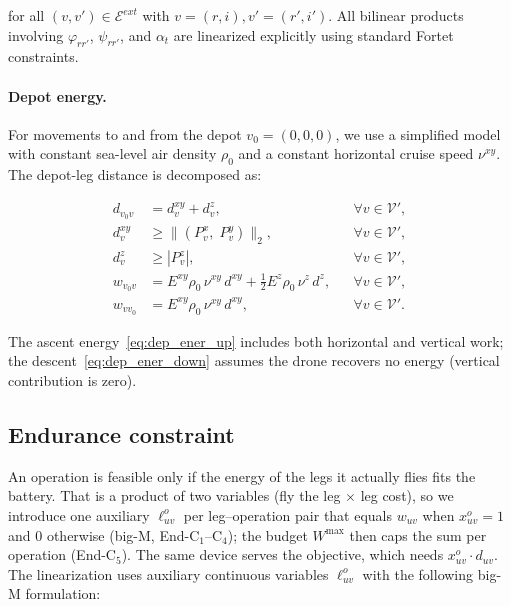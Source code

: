 \documentclass[12pt]{elsarticle}
\begin{document}
\noindent for all $(v,v')\in\mathcal E^{ext}$ with $v=(r,i), v'=(r',i')$. All bilinear products involving $\varphi_{rr'}$, $\psi_{rr'}$, and $\alpha_t$ are linearized explicitly using standard Fortet constraints.

\paragraph{Depot energy.}
For movements to and from the depot $v_0=(0,0,0)$, we use a simplified model with constant sea-level air density $\rho_0$ and a constant horizontal cruise speed $\nu^{xy}$. The depot-leg distance is decomposed as:

\begin{align}
    d_{v_0v} &= d_{v}^{xy} + d_v^z,
              && \forall v\in\mathcal V',
              \label{eq:dep_dist}\tag{Dep-C$_1$}\\
    d_{v}^{xy} &\ge \bigl\| (P_v^x,\;P_v^y) \bigr\|_2,
              && \forall v\in\mathcal V',
              \label{eq:dep_soc}\tag{Dep-C$_2$}\\
    d_v^z &\ge |P_v^z|,
              && \forall v\in\mathcal V',
              \label{eq:dep_z}\tag{Dep-C$_3$}\\
    w_{v_0v} &= E^{xy}\rho_0\,\nu^{xy}\,d^{xy} + \tfrac12 E^{z}\rho_0\,\nu^{z}\,d^z,
              && \forall v\in\mathcal V',
              \label{eq:dep_ener_up}\tag{Dep-C$_4$}\\
    w_{vv_0} &= E^{xy}\rho_0\,\nu^{xy}\,d^{xy},
              && \forall v\in\mathcal V'.
              \label{eq:dep_ener_down}\tag{Dep-C$_5$}
\end{align}

\noindent The ascent energy~\eqref{eq:dep_ener_up} includes both horizontal and vertical work; the descent~\eqref{eq:dep_ener_down} assumes the drone recovers no energy (vertical contribution is zero).

\subsection{Endurance constraint}

An operation is feasible only if the energy of the legs it actually flies fits the battery. That is a product of two variables (fly the leg $\times$ leg cost), so we introduce one auxiliary $\ell_{uv}^o$ per leg--operation pair that equals $w_{uv}$ when $x_{uv}^o=1$ and $0$ otherwise (big-M, End-C$_1$--C$_4$); the budget $W^{\max}$ then caps the sum per operation (End-C$_5$). The same device serves the objective, which needs $x_{uv}^o\cdot d_{uv}$. The linearization uses auxiliary continuous variables $\ell_{uv}^o$ with the following big-M formulation:
\end{document}
